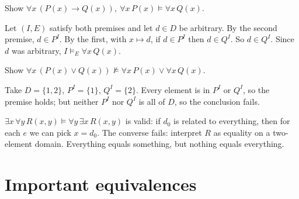\begin{example}
Show $\forall x\,(P(x)\to Q(x)),\ \forall x\,P(x)\models\forall x\,Q(x)$.

Let $(I,E)$ satisfy both premises and let $d\in D$ be arbitrary. By the second premise,
$d\in P^I$. By the first, with $x\mapsto d$, if $d\in P^I$ then $d\in Q^I$. So $d\in Q^I$.
Since $d$ was arbitrary, $I\models_E\forall x\,Q(x)$.
\end{example}

\begin{example}
Show $\forall x\,(P(x)\lor Q(x))\not\models\forall x\,P(x)\lor\forall x\,Q(x)$.

Take $D=\{1,2\}$, $P^I=\{1\}$, $Q^I=\{2\}$. Every element is in $P^I$ or $Q^I$, so the
premise holds; but neither $P^I$ nor $Q^I$ is all of $D$, so the conclusion fails.
\begin{center}
\end{center}
\end{example}

\begin{example}
$\exists x\,\forall y\,R(x,y)\models\forall y\,\exists x\,R(x,y)$ is valid: if $d_0$ is
related to everything, then for each $e$ we can pick $x=d_0$. The converse fails:
interpret $R$ as equality on a two-element domain. Everything equals something, but
nothing equals everything.
\end{example}

\section{Important equivalences}

